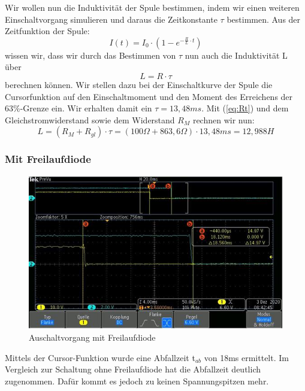 \documentclass{article}
\begin{document}
Wir wollen nun die Induktivität der Spule bestimmen, indem wir einen weiteren Einschaltvorgang simulieren und daraus die Zeitkonstante $\tau$ bestimmen. 
Aus der Zeitfunktion der Spule:
\begin{equation}
    I(t) = I_0 \cdot \left(1-e^{-\frac{R}{L}\cdot t}\right) 
\end{equation}
wissen wir, dass wir durch das Bestimmen von $\tau$ nun auch die Induktivität L über 
\begin{equation}\label{eq:Rt}
    L = R\cdot\tau
\end{equation}
berechnen können. Wir stellen dazu bei der Einschaltkurve der Spule die Cursorfunktion auf den Einschaltmoment und den Moment des Erreichens der 63\%-Grenze ein.
Wir erhalten damit ein $\tau = 13,48ms$. Mit (\ref{eq:Rt}) und dem Gleichstromwiderstand sowie dem Widerstand $R_M$ rechnen wir nun:
\begin{equation*}
    L = (R_M + R_{gl})\cdot \tau = (100\Omega + 863,6\Omega)\cdot 13,48ms = 12,988H
\end{equation*}

\newpage
\subsubsection{Mit Freilaufdiode}
\begin{figure}[h]
  \begin{center}
      \includegraphics[scale=0.9]{../assets/images/ET2P4/mit freilaufdiode.jpg}
      \caption{Auschaltvorgang mit Freilaufdiode}
  \end{center}
\end{figure}
Mittels der Cursor-Funktion wurde eine Abfallzeit t$_{ab}$ von 18ms ermittelt. Im Vergleich zur Schaltung ohne Freilaufdiode hat die Abfallzeit deutlich zugenommen.
Dafür kommt es jedoch zu keinen Spannungspitzen mehr.
\end{document}
